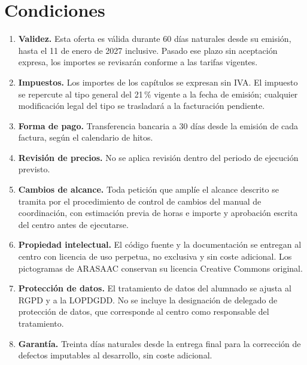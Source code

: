 \documentclass[a4paper,10pt]{article}
\begin{document}
\newpage
\section{Condiciones}

\begin{enumerate}[leftmargin=1.4em, itemsep=4pt, topsep=4pt]
  \item \textbf{Validez.} Esta oferta es válida durante 60 días naturales desde su emisión, hasta el 11 de enero de 2027 inclusive. Pasado ese plazo sin aceptación expresa, los importes se revisarán conforme a las tarifas vigentes.
  \item \textbf{Impuestos.} Los importes de los capítulos se expresan sin IVA. El impuesto se repercute al tipo general del 21\,\% vigente a la fecha de emisión; cualquier modificación legal del tipo se trasladará a la facturación pendiente.
  \item \textbf{Forma de pago.} Transferencia bancaria a 30 días desde la emisión de cada factura, según el calendario de hitos.
  \item \textbf{Revisión de precios.} No se aplica revisión dentro del periodo de ejecución previsto.
  \item \textbf{Cambios de alcance.} Toda petición que amplíe el alcance descrito se tramita por el procedimiento de control de cambios del manual de coordinación, con estimación previa de horas e importe y aprobación escrita del centro antes de ejecutarse.
  \item \textbf{Propiedad intelectual.} El código fuente y la documentación se entregan al centro con licencia de uso perpetua, no exclusiva y sin coste adicional. Los pictogramas de ARASAAC conservan su licencia Creative Commons original.
  \item \textbf{Protección de datos.} El tratamiento de datos del alumnado se ajusta al RGPD y a la LOPDGDD. No se incluye la designación de delegado de protección de datos, que corresponde al centro como responsable del tratamiento.
  \item \textbf{Garantía.} Treinta días naturales desde la entrega final para la corrección de defectos imputables al desarrollo, sin coste adicional.
\end{enumerate}

\vfill
\end{document}
